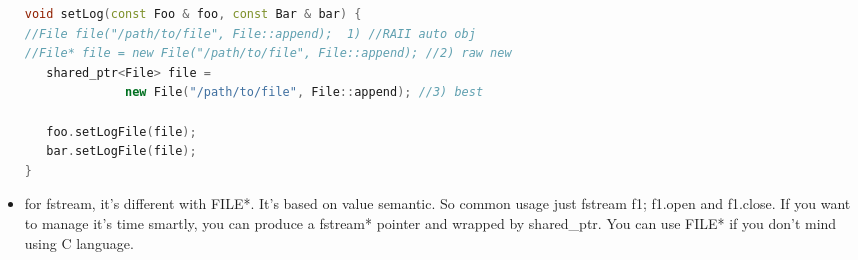\documentclass[a4paper,12pt,twoside]{book}
\begin{document}
\begin{itemize}
\begin{lstlisting}[frame=single, language=c++]
void setLog(const Foo & foo, const Bar & bar) {
//File file("/path/to/file", File::append);  1) //RAII auto obj
//File* file = new File("/path/to/file", File::append); //2) raw new
   shared_ptr<File> file =
              new File("/path/to/file", File::append); //3) best
              
   foo.setLogFile(file);
   bar.setLogFile(file);
}
\end{lstlisting}

\item for fstream, it's different with FILE*. It's based on value semantic. So common usage just fstream f1; f1.open and f1.close. If you want to manage it's time smartly, you can produce a fstream* pointer and wrapped by shared\_ptr. You can use FILE* if you don't mind using C language.

\end{itemize}
\end{document}
